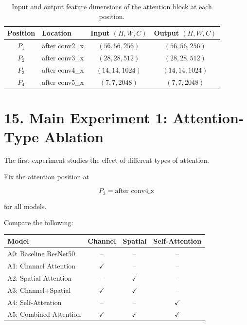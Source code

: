 \documentclass[10pt]{article}
\begin{document}
\begin{table}[H]
\centering
\caption{Input and output feature dimensions of the attention block at each position.}
\begin{tabular}{|c|l|c|c|}
\hline
\textbf{Position} & \textbf{Location} & \textbf{Input $(H,W,C)$} & \textbf{Output $(H,W,C)$}\\
\hline
$P_1$ & after conv2\_x & $(56,56,256)$ & $(56,56,256)$\\
\hline
$P_2$ & after conv3\_x & $(28,28,512)$ & $(28,28,512)$\\
\hline
$P_3$ & after conv4\_x & $(14,14,1024)$ & $(14,14,1024)$\\
\hline
$P_4$ & after conv5\_x & $(7,7,2048)$ & $(7,7,2048)$\\
\hline
\end{tabular}
\end{table}

\section*{15. Main Experiment 1: Attention-Type Ablation}

The first experiment studies the effect of different types of attention.

Fix the attention position at

\[
\boxed{
P_3=\text{after conv4\_x}
}
\]

for all models.

Compare the following:

\begin{center}
\begin{tabular}{|l|c|c|c|}
\hline
\textbf{Model} & \textbf{Channel} & \textbf{Spatial} & \textbf{Self-Attention} \\
\hline
A0: Baseline ResNet50 & \textcolor{gray}{--} & \textcolor{gray}{--} & \textcolor{gray}{--} \\
\hline
A1: Channel Attention & $\checkmark$ & \textcolor{gray}{--} & \textcolor{gray}{--} \\
\hline
A2: Spatial Attention & \textcolor{gray}{--} & $\checkmark$ & \textcolor{gray}{--} \\
\hline
A3: Channel+Spatial & $\checkmark$ & $\checkmark$ & \textcolor{gray}{--} \\
\hline
A4: Self-Attention & \textcolor{gray}{--} & \textcolor{gray}{--} & $\checkmark$ \\
\hline
A5: Combined Attention & $\checkmark$ & $\checkmark$ & $\checkmark$ \\
\hline
\end{tabular}
\end{center}
\end{document}
